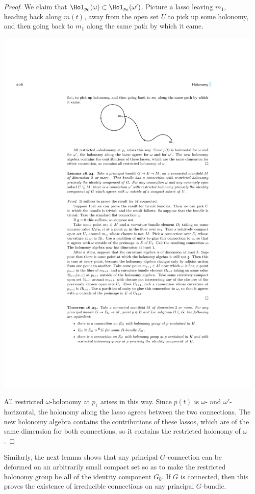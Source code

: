 \begin{proof}
    We claim that $\Hol_{p_0}(\omega)\subset \Hol_{p_0}(\omega')$. Picture a lasso leaving $m_1$, heading back along $m(t)$, away from the open set $U$ to pick up some holonomy, and then going back to $m_1$ along the same path by which it came. 
    \begin{center}
        \includegraphics[scale=0.8]{figures/holonomy.pdf}
    \end{center}
    All restricted $\omega$-holonomy at $p_1$ arises in this way. Since $p(t)$ is $\omega$- and $\omega'$-horizontal, the holonomy along the lasso agrees between the two connections.  The new holonomy algebra contains the contributions of these lassos, which are of the same dimension for both connections, so it contains the restricted holonomy of $\omega$.
\end{proof}


Similarly, the next lemma shows that any principal $G$-connection can be deformed on an arbitrarily small compact set so as to make the restricted holonomy group be all of the identity component $G_0$. If $G$ is connected, then this proves the existence of irreducible connections on any principal $G$-bundle.

